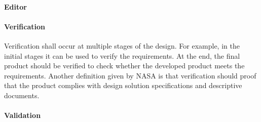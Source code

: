 \paragraph{Editor}

\paragraph{Verification}
Verification shall occur at multiple stages of the design. For example, in the initial stages it can be used to verify the requirements. At the end, the final product should be verified to check whether the developed product meets the requirements. Another definition given by NASA is that verification should proof that the product complies with design solution specifications and descriptive documents.

\paragraph{Validation}
